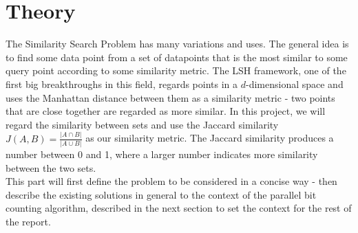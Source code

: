 \section{Theory}
The Similarity Search Problem has many variations and uses. The general idea is to find some data point from a set of datapoints that is the most similar to some query point according to some similarity metric. The LSH framework, one of the first big breakthroughs in this field, regards points in a $d$-dimensional space and uses the Manhattan distance between them as a similarity metric - two points that are close together are regarded as more similar\cite{classic-lsh}. In this project, we will regard the similarity between sets and use the Jaccard similarity $J(A,B)=\frac{|A\cap B|}{|A\cup B|}$ as our similarity metric. The Jaccard similarity produces a number between 0 and 1, where a larger number indicates more similarity between the two sets.\\
This part will first define the problem to be considered in a concise way - then describe the existing solutions in general to the context of the parallel bit counting algorithm, described in the next section to set the context for the rest of the report.





